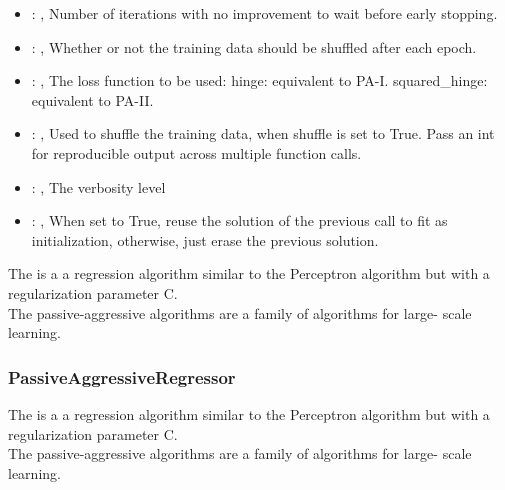 \begin{itemize}
    \item {}: , 
      Number of iterations with no improvement to wait before early stopping.

    \item {}: , 
      Whether or not the training data should be shuffled after each epoch.

    \item {}: , 
      The loss function to be used: hinge: equivalent to PA-I.
      squared\_hinge: equivalent to PA-II.

    \item {}: , 
      Used to shuffle the training data, when shuffle is set to
      True. Pass an int for reproducible output across multiple function calls.

    \item {}: , 
      The verbosity level

    \item {}: , 
      When set to True, reuse the solution of the previous call
      to fit as initialization, otherwise, just erase the previous solution.
  \end{itemize}
 The                          is a a regression algorithm
 similar to the Perceptron algorithm                         but with a regularization parameter C.
 \\The passive-aggressive algorithms are a family of algorithms for                         large-
 scale learning.                         

\subsubsection{PassiveAggressiveRegressor}
  The                          is a a regression algorithm
  similar to the Perceptron algorithm                         but with a regularization parameter C.
  \\The passive-aggressive algorithms are a family of algorithms for                         large-
  scale learning.                         

